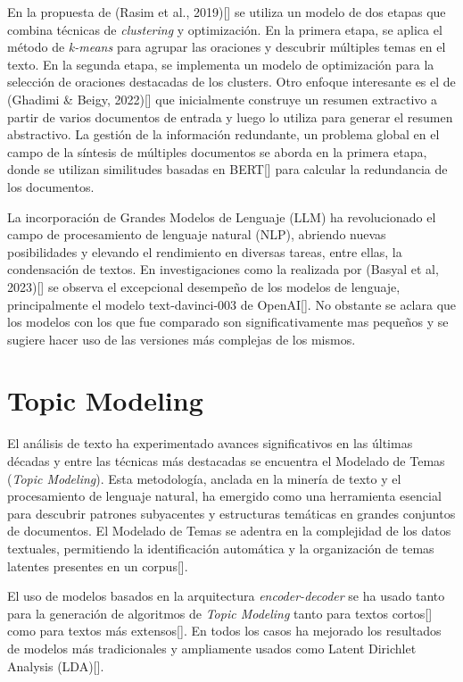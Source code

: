 En la propuesta de (Rasim et al., 2019)[\cite{cosum}] se utiliza un modelo de dos etapas que combina técnicas de \emph{clustering} y optimización. En la primera etapa, se aplica el método de \emph{k-means} para agrupar las oraciones y descubrir múltiples temas en el texto. En la segunda etapa, se implementa un modelo de optimización para la selección de oraciones destacadas de los clusters. Otro enfoque interesante es el de (Ghadimi \& Beigy, 2022)[\cite{hybrid-llm}] que inicialmente construye un resumen extractivo a partir de varios documentos de entrada y luego lo utiliza para generar el resumen abstractivo. La gestión de la información redundante, un problema global en el campo de la síntesis de múltiples documentos se aborda en la primera etapa, donde se utilizan similitudes basadas en BERT[\cite{BERT}] para calcular la redundancia de los documentos.

La incorporación de Grandes Modelos de Lenguaje (LLM) ha revolucionado el campo de procesamiento de lenguaje natural (NLP), abriendo nuevas posibilidades y elevando el rendimiento en diversas tareas, entre ellas, la condensación de textos. En investigaciones como la realizada por (Basyal et al, 2023)[\cite{basyal2023text}] se observa el excepcional desempeño de los modelos de lenguaje, principalmente el modelo text-davinci-003 de OpenAI[\cite{openai}]. No obstante se aclara que los modelos con los que fue comparado son significativamente mas peque\~nos y se sugiere hacer uso de las versiones más complejas de los mismos.

\section{Topic Modeling}

    El análisis de texto ha experimentado avances significativos en las últimas décadas y entre las técnicas más destacadas se encuentra el Modelado de Temas (\emph{Topic Modeling}). Esta metodología, anclada en la minería de texto y el procesamiento de lenguaje natural, ha emergido como una herramienta esencial para descubrir patrones subyacentes y estructuras temáticas en grandes conjuntos de documentos. El Modelado de Temas se adentra en la complejidad de los datos textuales, permitiendo la identificación automática y la organización de temas latentes presentes en un corpus[\cite{lda2003}].

    El uso de modelos basados en la arquitectura \emph{encoder-decoder} se ha usado tanto para la generación de algoritmos de \emph{Topic Modeling }tanto para textos cortos[\cite{neuraltm}] como para textos más extensos[\cite{tminemb}]. En todos los casos ha mejorado los resultados de modelos más tradicionales y ampliamente usados como Latent Dirichlet Analysis (LDA)[\cite{lda2003}].  

